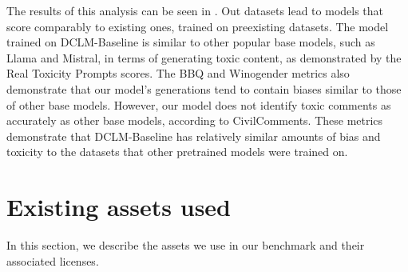 \documentclass{article}
\begin{document}
The results of this analysis can be seen in .
Out datasets lead to models that score comparably to existing ones, trained on preexisting datasets.
The model trained on DCLM-Baseline is similar to other popular base models, such as Llama and Mistral, in terms of generating toxic content, as demonstrated by the Real Toxicity Prompts scores.
The BBQ and Winogender metrics also demonstrate that our model’s generations tend to contain biases similar to those of other base models.
However, our model does not identify toxic comments as accurately as other base models, according to CivilComments.
These metrics demonstrate that DCLM-Baseline has relatively similar amounts of bias and toxicity to the datasets that other pretrained models were trained on.




\section{Existing assets used}\label{appx:existing-assets}
In this section, we describe the assets we use in our benchmark and their associated licenses.
\end{document}
